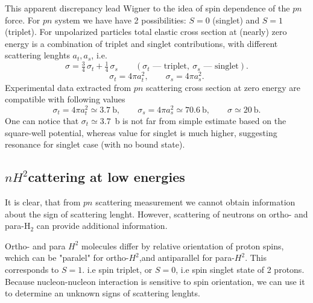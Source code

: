 \documentclass[11pt,a4paper]{article}
\begin{document}
This apparent discrepancy lead Wigner to the idea of spin dependence of the $pn$ force. For $pn$ system we have have 2 possibilities:
$S=0$ (singlet) and $S=1$ (triplet). For unpolarized particles total elastic cross section at (nearly) zero energy is a combination of triplet and singlet contributions, with different scattering lenghts $a_t, a_s$, i.e. 
\[
\sigma=\tfrac34\,\sigma_t+\tfrac14\,\sigma_s
\qquad(\sigma_t \text{ --- triplet},\ \sigma_s \text{ --- singlet}).
\]
\[
\sigma_t=4\pi a_t^2,\qquad \sigma_s=4\pi a_s^2.
\]
Experimental data extracted from $pn$ scattering cross section at zero energy are compatible with following values    
\[
\sigma_t=4\pi a_t^2\simeq3.7\ \text{b} ,
\qquad
\sigma_s=4\pi a_s^2\simeq70.6\ \text{b},
\qquad
\sigma\simeq20\ \text{b}.
\]
One can notice that $\sigma_t\simeq3.7$~b is not far from simple estimate based on the square-well potential, whereas value for singlet is much higher, suggesting resonance for singlet case (with no bound state).
\subsection{\texorpdfstring{$nH^2$} scattering at low energies}
It is clear, that from $pn$ scattering measurement we cannot obtain information about the sign of scattering lenght. 
However, scattering of neutrons on  ortho- and para-H$_2$ can provide additional information. 

Ortho- and para $H^2$ molecules differ by relative orientation of proton spins, wchich can be "paralel" for ortho-$H^2$,and antiparallel for para-$H^2$. This corresponds to $S=1$. i.e spin triplet, or $S=0$, i.e spin singlet state of 2 protons. Because nucleon-nucleon interaction is sensitive to spin orientation, we can use it to determine an unknown signs of scattering lenghts. 
\begin{center}
\end{center}
\end{document}
